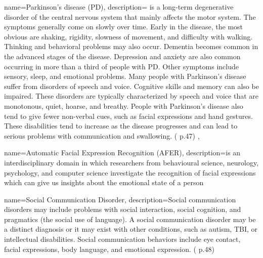  {
	name={Parkinson’s disease (PD)},
	description={ is a long-term degenerative disorder of the central nervous system that mainly affects the motor system. The symptoms generally come on slowly over time. Early in the disease, the most obvious are shaking, rigidity, slowness of movement, and difficulty with walking. Thinking and behavioral problems may also occur. Dementia becomes common in the advanced stages of the disease. Depression and anxiety are also common occurring in more than a third of people with PD. Other symptoms include sensory, sleep, and emotional problems. Many people with Parkinson's disease suffer from disorders of speech and voice. Cognitive skills and memory can also be impaired. These disorders are typically characterized by speech and voice that are monotonous, quiet, hoarse, and breathy. People with Parkinson's disease also tend to give fewer non-verbal cues, such as facial expressions and hand gestures. These disabilities tend to increase as the disease progresses and can lead to serious problems with communication and swallowing. (\cite{SLPathologies} p.47)
},
}


 {
	name={Automatic Facial Expression Recognition (AFER)},
	description={is an interdisciplinary domain in which researchers from behavioural science, neurology, psychology, and computer science investigate the recognition of facial expressions which can give us insights about the emotional state of a person
}
}


 
 
 
 {
	name={Social Communication Disorder}, 
	description={Social communication disorders may include problems with social interaction, social cognition, and pragmatics (the social use of language). A social communication disorder may be a distinct diagnosis or it may exist with other conditions, such as autism, TBI, or intellectual disabilities. Social communication behaviors include eye contact, facial expressions, body language, and emotional expression. (\cite{SLPathologies} p.48)
}
}


